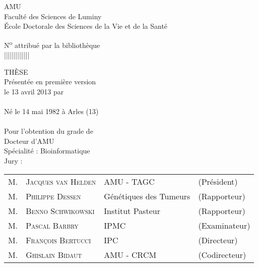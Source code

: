 \thispagestyle{empty}
  \begin{center}
    \avantgarLarge \acl{AMU}\\[1ex]
    \avantgar Faculté des Sciences de Luminy\\[1ex]
    \avantgar École Doctorale des Sciences de la Vie et de la Santé\\[3ex]
  \end{center}

  \begin{flushright}
    \avantgar N\textsuperscript{o} attribué par la bibliothèque\\[1ex]
    \avantgar |\textunderscore|\textunderscore|\textunderscore|\textunderscore|\textunderscore|\textunderscore|\textunderscore|\textunderscore|\textunderscore|\textunderscore|\textunderscore|\textunderscore|\\[1ex]
  \end{flushright}

  \begin{center}
    \avantgarboldHuge THÈSE\\[1.5ex]

    \avantgarlarge Présentée en première version\\[1ex]
    \avantgarlarge le 13 avril 2013 par\\[1ex]
    \avantgarLarge \myauthor\\[1ex]
    \avantgar Né le 14 mai 1982 à Arles (13)\\[5ex]

    \avantgarboldHuge \mytitlefr\\[2ex]

    \avantgarlarge Pour l'obtention du grade de\\[1ex]
    \avantgarLarge Docteur d'\acl{AMU}\\[1ex]
    \avantgarlarge Spécialité : Bioinformatique\\[5ex]

    \avantgarlarge Jury :\\[1ex]
    \begin{tabular}{llll}
      {\Large M.} & {\Large\textsc{Jacques van Helden}}  & {\large \acs{AMU} - \acs{TAGC}}  & {\large(Président)}   \\
      {\Large M.} & {\Large\textsc{Philippe Dessen}}     & {\large Génétiques des Tumeurs}  & {\large(Rapporteur)}  \\
      {\Large M.} & {\Large\textsc{Benno Schwikowski}}   & {\large Institut Pasteur}        & {\large(Rapporteur)}  \\
      {\Large M.} & {\Large\textsc{Pascal Barbry}}       & {\large \acs{IPMC}}              & {\large(Examinateur)} \\
      {\Large M.} & {\Large\textsc{François Bertucci}}   & {\large \acs{IPC}}               & {\large(Directeur)}   \\
      {\Large M.} & {\Large\textsc{Ghislain Bidaut}}     & {\large \acs{AMU} - \acs{CRCM}}  & {\large(Codirecteur)} \\
    \end{tabular}
  \end{center}